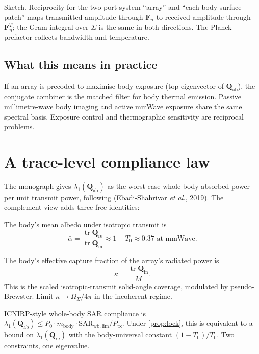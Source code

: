 \documentclass[11pt,a4paper]{article}
\theoremstyle{definition}
\DeclareMathOperator{\tr}{tr}
\newcommand{\Fn}{\mathbf{F}_{\!n}}
\newcommand{\Qabs}{\mathbf{Q}_{\mathrm{ab}}}
\newcommand{\Qref}{\mathbf{Q}_{\mathrm{re}}}
\newcommand{\Qinn}{\mathbf{Q}_{\mathrm{in}}}
\begin{document}
Sketch.  Reciprocity for the two-port system ``array'' and
``each body surface patch'' maps transmitted amplitude through $\Fn$
to received amplitude through $\Fn^{\!T}$; the Gram integral over
$\Sigma$ is the same in both directions.  The Planck prefactor
collects bandwidth and temperature.

\subsection{What this means in practice}

If an array is precoded to maximise body exposure (top eigenvector
of $\Qabs$), the conjugate combiner is the matched filter for
body thermal emission.  Passive millimetre-wave body imaging and
active mmWave exposure share the same spectral basis.  Exposure
control and thermographic sensitivity are reciprocal problems.

\section{A trace-level compliance law}

The monograph gives $\lambda_1(\Qabs)$ as the worst-case
whole-body absorbed power per unit transmit power, following
(Ebadi-Shahrivar \textit{et al.}, 2019).  The complement view adds
three free identities:

\begin{description}[leftmargin=0pt,style=nextline]
\item[Albedo.] The body's mean albedo under isotropic transmit is
\[
  \bar\alpha = \frac{\tr\Qref}{\tr\Qinn}
  \approx 1-T_0\approx 0.37 \text{ at mmWave}.
\]
\item[Capture cross-section.] The body's effective capture
fraction of the array's radiated power is
\[
  \bar\kappa = \frac{\tr\Qinn}{M}.
\]
This is the scaled isotropic-transmit solid-angle coverage, modulated
by pseudo-Brewster.  Limit $\bar\kappa\to\Omega_\Sigma/4\pi$ in the
incoherent regime.
\item[Array-level compliance.]  ICNIRP-style whole-body SAR
compliance is $\lambda_1(\Qabs)\le P_0\cdot m_{\mathrm{body}}\cdot
\mathrm{SAR}_{\mathrm{wb,lim}}/P_{\mathrm{tx}}$.  Under
\cref{prop:lock}, this is equivalent to a bound on
$\lambda_1(\Qref)$ with the body-universal constant $(1-T_0)/T_0$.
Two constraints, one eigenvalue.
\end{description}
\end{document}
